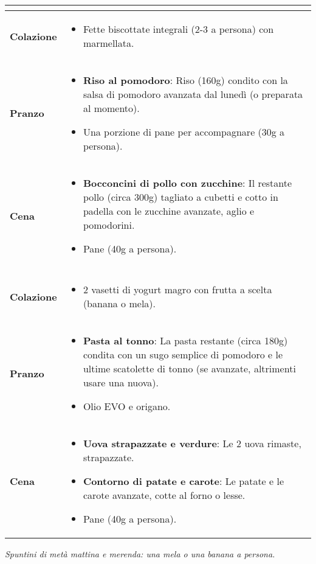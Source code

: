 \documentclass[a4paper, 11pt]{article}
\begin{document}
\begin{tabular}{|>{\bfseries}m{2.5cm}|m{12.5cm}|}
\hline
\multicolumn{2}{|c|}{\cellcolor{lightgray}\bfseries GIOVEDÌ} \\
\hline
\textbf{Colazione} & 
\begin{itemize}[noitemsep, topsep=0pt, leftmargin=*]
    \item Fette biscottate integrali (2-3 a persona) con marmellata.
\end{itemize} \\
\hline
\textbf{Pranzo} & 
\begin{itemize}[noitemsep, topsep=0pt, leftmargin=*]
    \item \textbf{Riso al pomodoro}: Riso (160g) condito con la salsa di pomodoro avanzata dal lunedì (o preparata al momento).
    \item Una porzione di pane per accompagnare (30g a persona).
\end{itemize} \\
\hline
\textbf{Cena} & 
\begin{itemize}[noitemsep, topsep=0pt, leftmargin=*]
    \item \textbf{Bocconcini di pollo con zucchine}: Il restante pollo (circa 300g) tagliato a cubetti e cotto in padella con le zucchine avanzate, aglio e pomodorini.
    \item Pane (40g a persona).
\end{itemize} \\
\hline
\multicolumn{2}{|c|}{\cellcolor{lightgray}\bfseries VENERDÌ} \\
\hline
\textbf{Colazione} & 
\begin{itemize}[noitemsep, topsep=0pt, leftmargin=*]
    \item 2 vasetti di yogurt magro con frutta a scelta (banana o mela).
\end{itemize} \\
\hline
\textbf{Pranzo} & 
\begin{itemize}[noitemsep, topsep=0pt, leftmargin=*]
    \item \textbf{Pasta al tonno}: La pasta restante (circa 180g) condita con un sugo semplice di pomodoro e le ultime scatolette di tonno (se avanzate, altrimenti usare una nuova).
    \item Olio EVO e origano.
\end{itemize} \\
\hline
\textbf{Cena} & 
\begin{itemize}[noitemsep, topsep=0pt, leftmargin=*]
    \item \textbf{Uova strapazzate e verdure}: Le 2 uova rimaste, strapazzate.
    \item \textbf{Contorno di patate e carote}: Le patate e le carote avanzate, cotte al forno o lesse.
    \item Pane (40g a persona).
\end{itemize} \\
\hline
\end{tabular}
\vspace{1cm}
\begin{center}
    \textit{Spuntini di metà mattina e merenda: una mela o una banana a persona.}
\end{center}
\end{document}
